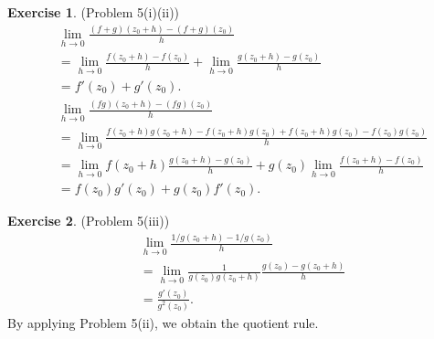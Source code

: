 \documentclass[12pt, psamsfonts]{amsart}
\theoremstyle{definition}
\newtheorem*{exer}{Exercise}
\theoremstyle{remark}
\numberwithin{equation}{section}
\begin{document}
\begin{exer}{(Problem 5(i)(ii))}
  \begin{align*}
    &\lim_{h \rightarrow 0} \frac{(f + g)(z_0 + h) - (f + g)(z_0)}{h} \\
      &= \lim_{h \rightarrow 0} \frac{f(z_0 + h) - f(z_0)}{h} + \lim_{h \rightarrow 0} \frac{g(z_0 + h) - g(z_0)}{h} \\
      &= f'(z_0) + g'(z_0). \\
    &\lim_{h \rightarrow 0} \frac{(fg)(z_0 + h) - (fg)(z_0)}{h} \\
      &= \lim_{h \rightarrow 0} \frac{f(z_0 + h)g(z_0 + h) - f(z_0 + h)g(z_0) + f(z_0 + h)g(z_0) - f(z_0)g(z_0)}{h} \\
      &= \lim_{h \rightarrow 0} f(z_0 + h)\frac{g(z_0 + h) - g(z_0)}{h} + g(z_0)\lim_{h \rightarrow 0}\frac{f(z_0 + h) - f(z_0)}{h} \\
      &= f(z_0)g'(z_0) + g(z_0)f'(z_0).
  \end{align*}
\end{exer}

\begin{exer}{(Problem 5(iii))}
  \begin{align*}
    &\lim_{h \rightarrow 0} \frac{1/g(z_0 + h) - 1 / g(z_0)}{h} \\
      &= \lim_{h \rightarrow 0} \frac{1}{g(z_0)g(z_0+h)} \frac{g(z_0) - g(z_0 + h)}{h} \\
      &= \frac{g'(z_0)}{g^2(z_0)}.
  \end{align*}
  By applying Problem 5(ii), we obtain the quotient rule.
\end{exer}
\end{document}
